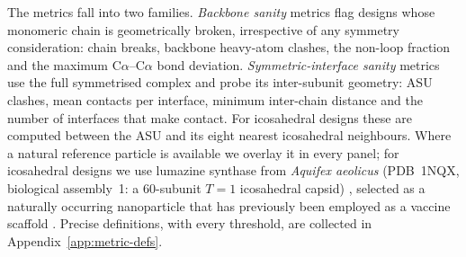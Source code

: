 The metrics fall into two families. \emph{Backbone sanity} metrics flag designs
whose monomeric chain is geometrically broken, irrespective of any symmetry
consideration: chain breaks, backbone heavy-atom clashes, the non-loop fraction
and the maximum C$\alpha$--C$\alpha$ bond deviation. \emph{Symmetric-interface
sanity} metrics use the full symmetrised complex and probe its inter-subunit
geometry: ASU clashes, mean contacts per interface, minimum inter-chain distance
and the number of interfaces that make contact. For icosahedral designs these are
computed between the ASU and its eight nearest icosahedral neighbours. Where a
natural reference particle is available we overlay it in every panel; for
icosahedral designs we use lumazine synthase from \emph{Aquifex aeolicus}
(PDB~1NQX, biological assembly~1: a 60-subunit $T{=}1$ icosahedral capsid)
\parencite{zhang_structure-based_2003}, selected as a naturally occurring
nanoparticle that has previously been employed as a vaccine scaffold
\parencite{ladenstein_second_2020,joseph_lumazine_2025}. Precise definitions, with
every threshold, are collected in Appendix~\ref{app:metric-defs}.
